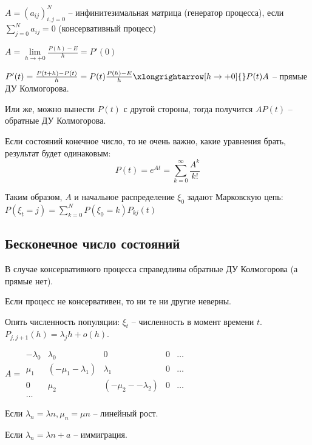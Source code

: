 \begin{Def}
$A = (a_{ij})_{i,j=0}^N$ -- инфинитезимальная матрица (генератор процесса), если $\sum\limits_{j=0}^N a_{ij} = 0$ (консервативный процесс)
\end{Def}

$A = \lim\limits_{h \to +0} \frac{P(h) - E}{h} = P'(0)$

$P'(t) = \frac{P(t+h) - P(t)}{h} = P(t) \frac{P(h) - E}{h} \xlongrightarrow[h \to +0]{} P(t) A$ -- прямые ДУ Колмогорова.

Или же, можно вынести $P(t)$ с другой стороны, тогда получится $AP(t)$ -- обратные ДУ Колмогорова.

Если состояний конечное число, то не очень важно, какие уравнения брать, результат будет одинаковым: 
$$P(t) = e^{At} = \sum\limits_{k = 0}^\infty \frac{A^k}{k!}$$

Таким образом, $A$ и начальное распределение $\xi_0$ задают Марковскую цепь: $P(\xi_t = j) = \sum\limits_{k=0}^N P(\xi_0 = k) P_{kj}(t)$

\subsection{Бесконечное число состояний}
В случае консервативного процесса справедливы обратные ДУ Колмогорова (а прямые нет).

Если процесс не консервативен, то ни те ни другие неверны.

\begin{exmp}
Опять численность популяции: $\xi_t$ -- численность в момент времени $t$. $P_{j,j+1}(h) = \lambda_jh + o(h)$.

$A = \begin{matrix}
-\lambda_0 & \lambda_0 & 0 & 0 & \dots \\
\mu_1 & (-\mu_1 - \lambda_1) & \lambda_1 & 0 & \dots \\
0 & \mu_2 & (-\mu_2 - -\lambda_2) & 0 & \dots \\
\dots
\end{matrix}$

Если $\lambda_n = \lambda n, \mu_n = \mu n$ -- линейный рост.

Если $\lambda_n = \lambda n + a$ -- иммиграция.
\end{exmp}